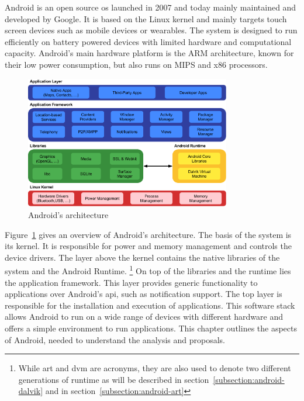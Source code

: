 Android is an open source \gls{os} launched in 2007 and today mainly maintained and developed by Google.
It is based on the Linux kernel and mainly targets touch screen devices such as mobile devices or wearables.
The system is designed to run efficiently on battery powered devices with limited hardware and computational capacity.
Android's main hardware platform is the ARM architecture, known for their low power consumption, but also runs on MIPS and x86 processors.
\begin{figure}[h]
    \centering
    \includegraphics[width=0.8\textwidth]{data/stack.png}
    \caption{Android's architecture \cite{googleDalvik}}
    \label{fig:androidArchitecture}
\end{figure}
\newline
Figure~\ref{fig:androidArchitecture} gives an overview of Android's architecture.
\newline
The basis of the system is its kernel.
It is responsible for power and memory management and controls the device drivers.
\newline
The layer above the kernel contains the native libraries of the system and the Android Runtime.
\footnote[1]{While \gls{art} and \gls{dvm} are acronyms, they are also used to denote two different generations of runtime as will be described in section~\ref{subsection:android-dalvik} and in section~\ref{subsection:android-art}}
\newline
On top of the libraries and the runtime lies the application framework.
This layer provides generic functionality to applications over Android's \gls{api}, such as notification support.
\newline
The top layer is responsible for the installation and execution of applications.
\newline
This software stack allows Android to run on a wide range of devices with different hardware and offers a simple environment to run applications.
\newline
\newline
This chapter outlines the aspects of Android, needed to understand the analysis and proposals.
